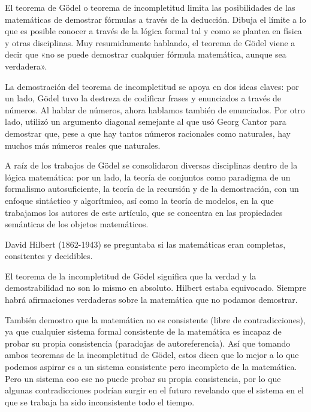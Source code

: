 El teorema de Gödel o teorema de incompletitud limita las posibilidades de las
matemáticas de demostrar fórmulas a través de la deducción. Dibuja el límite a
lo que es posible conocer a través de la lógica formal tal y como se plantea en
física y otras disciplinas.  Muy resumidamente hablando, el teorema de Gödel
viene a decir que «no se puede demostrar cualquier fórmula matemática, aunque
sea verdadera».

La demostración del teorema de incompletitud se apoya en dos ideas claves: por
un lado, Gödel tuvo la destreza de codificar frases y enunciados a través de
números. Al hablar de números, ahora hablamos también de enunciados. Por otro
lado, utilizó un argumento diagonal semejante al que usó Georg Cantor para
demostrar que, pese a que hay tantos números racionales como naturales, hay
muchos más números reales que naturales.

A raíz de los trabajos de Gödel se consolidaron diversas disciplinas dentro de
la lógica matemática: por un lado, la teoría de conjuntos como paradigma de un
formalismo autosuficiente, la teoría de la recursión y de la demostración, con
un enfoque sintáctico y algorítmico, así como la teoría de modelos, en la que
trabajamos los autores de este artículo, que se concentra en las propiedades
semánticas de los objetos matemáticos.

David Hilbert (1862-1943) se preguntaba si las matemáticas eran completas,
consitentes y decidibles.

El teorema de la incompletitud de Gödel significa que la verdad y la
demostrabilidad no son lo mismo en absoluto. Hilbert estaba equivocado. Siempre
habrá afirmaciones verdaderas sobre la matemática que no podamos demostrar.

También demostro que la matemática no es consistente (libre de contradicciones),
ya que cualquier sistema formal consistente de la matemática es incapaz de
probar su propia consistencia (paradojas de autoreferencia). Así que tomando
ambos teoremas de la incompletitud de Gödel, estos dicen que lo mejor a lo que
podemos aspirar es a un sistema consistente pero incompleto de la matemática.
Pero un sistema coo ese no puede probar su propia consistencia, por lo que
algunas contradicciones podrían surgir en el futuro revelando que el sistema en
el que se trabaja ha sido inconsistente todo el tiempo.




